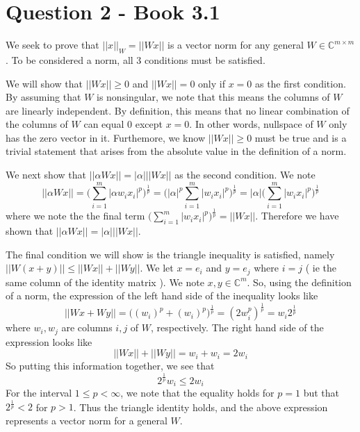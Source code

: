 \documentclass[a4paper,12pt]{article}
\begin{document}
\section{Question 2 - Book 3.1}

We seek to prove that $||x||_W = || Wx || $ is a vector norm for any general $W \in \mathbb{C}^{m\times m}$. To be considered a norm, all 3 conditions must be satisfied. 

We will show that $|| Wx || \geq 0$ and $|| Wx || =0$ only if $x=0$ as the first condition. By assuming that $W$ is nonsingular, we note that this means the columns of $W$ are linearly independent. By definition, this means that no linear combination of the columns of $W$ can equal 0 except $x=0$. In other words,  nullspace of $W$ only has the zero vector in it. Furthemore, we know $||Wx|| \geq 0$ must be true and is a trivial statement that arises from the absolute value in the definition of a norm. 


We next show that $|| \alpha Wx || = |\alpha | || Wx ||$ as the second condition. We note
\begin{equation}
|| \alpha Wx || = \bigg( \sum_{i=1}^m | \alpha w_i x_i |^p \bigg)^{\frac{1}{p}} =  \bigg( |\alpha|^p \sum_{i=1}^m |  w_i x_i |^p \bigg)^{\frac{1}{p}} = |\alpha | \bigg( \sum_{i=1}^m |  w_i x_i |^p \bigg)^{\frac{1}{p}}
\end{equation}
where we note the the final term $\bigg( \sum_{i=1}^m |  w_i x_i |^p \bigg)^{\frac{1}{p}} = || Wx||$. Therefore we have shown that $|| \alpha Wx || = |\alpha | || Wx ||$.

The final condition we will show is the triangle inequality is satisfied, namely $|| W(x+y) || \leq || Wx || + || Wy ||$. We let $x=e_i$ and $y=e_j$ where $i = j$ ( ie the same column of the identity matrix ). We note $x,y \in \mathbb{C}^m$. So, using the definition of a norm, the expression of the left hand side of the inequality looks like
\begin{equation}
|| Wx + Wy || = \bigg( (w_i)^p + (w_i)^p \bigg)^{\frac{1}{p}} =(2w_i^p)^{\frac{1}{p}} = w_i 2^{\frac{1}{p}}
\end{equation}
where $w_i, w_j$ are columns $i,j$ of $W$, respectively. 
The right hand side of the expression looks like
\begin{equation}
|| Wx || + || Wy || = w_i  + w_i = 2w_i
\end{equation}
So putting this information together, we see that
\begin{equation}
2^{\frac{1}{p}}w_i \leq 2w_i 
\end{equation}
For the interval $1\leq p < \infty$, we note that the equality holds for $p=1$ but that $2^{\frac{1}{p}} < 2$ for $p>1$. Thus the triangle identity holds, and the above expression represents a vector norm for a general $W$.
\end{document}
